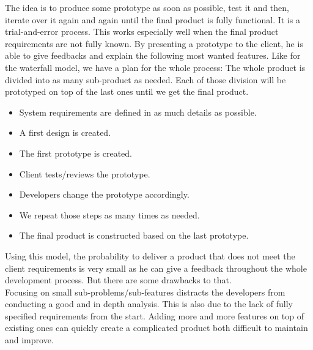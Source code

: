 \documentclass[12pt]{article}
\theoremstyle{definition}
\theoremstyle{definition}
\theoremstyle{remark}
\begin{document}
The idea is to produce some prototype as soon as possible, test it and then, iterate over it again and again until the final product is fully functional. It is a trial-and-error process. This works especially well when the final product requirements are not fully known. By presenting a prototype to the client, he is able to give feedbacks and explain the following most wanted features. Like for the waterfall model, we have a plan for the whole process: The whole product is divided into as many sub-product as needed. Each of those division will be prototyped on top of the last ones until we get the final product.\\

\begin{itemize}

\item System requirements are defined in as much details as possible.
\item A first design is created.
\item The first prototype is created.
\item Client tests/reviews the prototype.
\item Developers change the prototype accordingly.
\item We repeat those steps as many times as needed.
\item The final product is constructed based on the last prototype.

\end{itemize}

Using this model, the probability to deliver a product that does not meet the client requirements is very small as he can give a feedback throughout the whole development process. But there are some drawbacks to that.\\

Focusing on small sub-problems/sub-features distracts the developers from conducting a good and in depth analysis. This is also due to the lack of fully specified requirements from the start. Adding more and more features on top of existing ones can quickly create a complicated product both difficult to maintain and improve.\\
\end{document}
